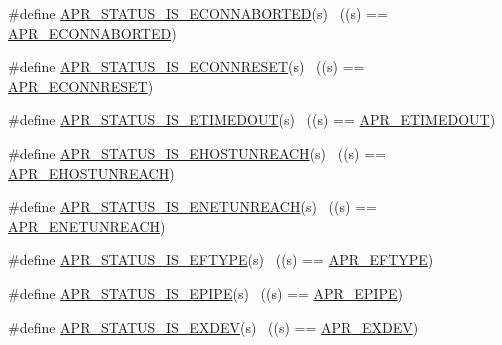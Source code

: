 \begin{DoxyCompactItemize}
\item 
\#define \hyperlink{group___a_p_r___s_t_a_t_u_s___i_s_gaeb76524e9ea3328057bacc81c0095ae8}{A\+P\+R\+\_\+\+S\+T\+A\+T\+U\+S\+\_\+\+I\+S\+\_\+\+E\+C\+O\+N\+N\+A\+B\+O\+R\+T\+ED}(s)    ~((s) == \hyperlink{group___a_p_r___error_ga9458da18e0ee46a5d37c9cdfdc43efd2}{A\+P\+R\+\_\+\+E\+C\+O\+N\+N\+A\+B\+O\+R\+T\+ED})
\item 
\#define \hyperlink{group___a_p_r___s_t_a_t_u_s___i_s_ga866d4ddd8e32221fb547ad7c6ee87ac5}{A\+P\+R\+\_\+\+S\+T\+A\+T\+U\+S\+\_\+\+I\+S\+\_\+\+E\+C\+O\+N\+N\+R\+E\+S\+ET}(s)        ~((s) == \hyperlink{group___a_p_r___error_ga264bfe2056e917728e9ed060b58869c2}{A\+P\+R\+\_\+\+E\+C\+O\+N\+N\+R\+E\+S\+ET})
\item 
\#define \hyperlink{group___a_p_r___s_t_a_t_u_s___i_s_gaaebbfb9eaa474d3e6da99e2b3eb6e3d1}{A\+P\+R\+\_\+\+S\+T\+A\+T\+U\+S\+\_\+\+I\+S\+\_\+\+E\+T\+I\+M\+E\+D\+O\+UT}(s)        ~((s) == \hyperlink{group___a_p_r___error_ga6aeccbe9accb34f0adc1cb1ab9a82a8d}{A\+P\+R\+\_\+\+E\+T\+I\+M\+E\+D\+O\+UT})
\item 
\#define \hyperlink{group___a_p_r___s_t_a_t_u_s___i_s_ga6692fb87431d5d58747e10273d41c230}{A\+P\+R\+\_\+\+S\+T\+A\+T\+U\+S\+\_\+\+I\+S\+\_\+\+E\+H\+O\+S\+T\+U\+N\+R\+E\+A\+CH}(s)    ~((s) == \hyperlink{group___a_p_r___error_ga489b0c02fa7cf33ed6d698d385661f86}{A\+P\+R\+\_\+\+E\+H\+O\+S\+T\+U\+N\+R\+E\+A\+CH})
\item 
\#define \hyperlink{group___a_p_r___s_t_a_t_u_s___i_s_ga51a7c94e6a19b41cff77b0acd7c4f879}{A\+P\+R\+\_\+\+S\+T\+A\+T\+U\+S\+\_\+\+I\+S\+\_\+\+E\+N\+E\+T\+U\+N\+R\+E\+A\+CH}(s)      ~((s) == \hyperlink{group___a_p_r___error_gab9b7124a88817d1b69cdef059f7dc689}{A\+P\+R\+\_\+\+E\+N\+E\+T\+U\+N\+R\+E\+A\+CH})
\item 
\#define \hyperlink{group___a_p_r___s_t_a_t_u_s___i_s_gae9db0023f8c7f6ff2cbb0de1f45a0fcf}{A\+P\+R\+\_\+\+S\+T\+A\+T\+U\+S\+\_\+\+I\+S\+\_\+\+E\+F\+T\+Y\+PE}(s)                ~((s) == \hyperlink{group___a_p_r___error_gac358701354d03c37e3f0de12ed6d9afc}{A\+P\+R\+\_\+\+E\+F\+T\+Y\+PE})
\item 
\#define \hyperlink{group___a_p_r___s_t_a_t_u_s___i_s_ga5f19f9dd7664901c2d2e59b6566abeb7}{A\+P\+R\+\_\+\+S\+T\+A\+T\+U\+S\+\_\+\+I\+S\+\_\+\+E\+P\+I\+PE}(s)                  ~((s) == \hyperlink{group___a_p_r___error_gae985330e30e374714ff1742485597f5d}{A\+P\+R\+\_\+\+E\+P\+I\+PE})
\item 
\#define \hyperlink{group___a_p_r___s_t_a_t_u_s___i_s_gacc904a0533b6111e1399e56120effaff}{A\+P\+R\+\_\+\+S\+T\+A\+T\+U\+S\+\_\+\+I\+S\+\_\+\+E\+X\+D\+EV}(s)                  ~((s) == \hyperlink{group___a_p_r___error_ga0562023bd8ebe580b9bbb9f7b04d3f5d}{A\+P\+R\+\_\+\+E\+X\+D\+EV})

\end{DoxyCompactItemize}
